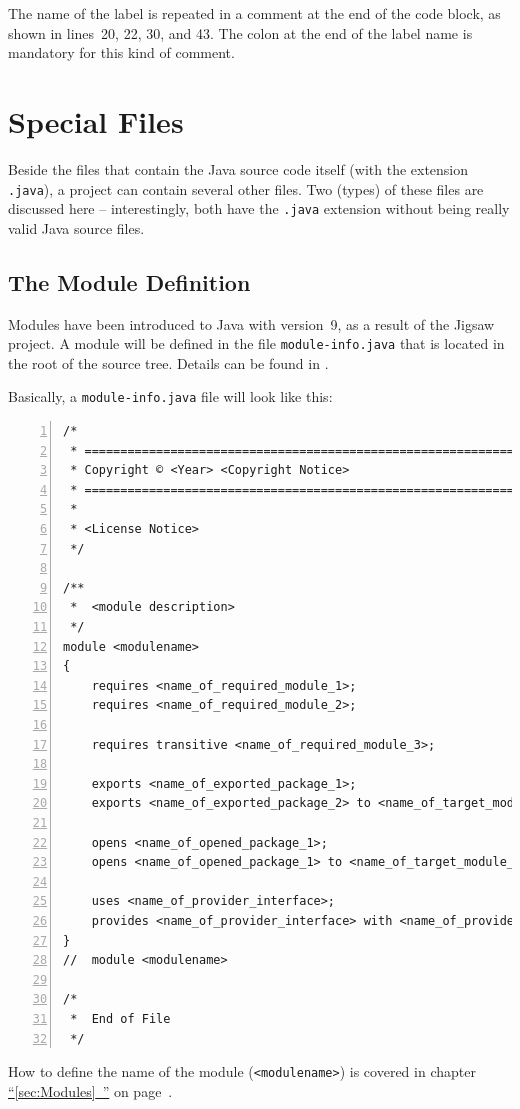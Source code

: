 \documentclass[11pt,a4paper, titlepage, parskip=half, headsepline, footsepline, cleardoublepage=current, headheight=1cm]{scrbook}
\newcommand*{\tqfullvref}[1]{\hyperref[{#1}]{“\ref*{#1}~\nameref*{#1}”} on page~\pageref{#1}}
\begin{document}
The name of the label is repeated in a comment at the end of the code block, as shown in lines~20, 22, 30, and 43. The colon at the end of the label name is mandatory for this kind of comment.


\section{Special Files}
Beside the files that contain the Java source code itself (with the extension \verb#.java#), a project can contain several other files. Two (types) of these files are discussed here – interestingly, both have the \verb#.java# extension without being really valid Java source files.

\subsection{The Module Definition}\label{sec:ModuleDefinition}
Modules have been introduced to Java with version~9, as a result of the Jigsaw project\autocite{OPENJDK:ProjectJigsaw}. A module will be defined in the file \verb#module-info.java# that is located in the root of the source tree. Details can be found in \autocite{ORACLE_DOC_LANGUAGE_SPECIFICATION:ModuleDeclarations}.

Basically, a \verb#module-info.java# file will look like this:
\begin{lstlisting}[numbers=left, caption={module-info.java},morekeywords={exports,module,opens,provides,requires,to,transitive,uses,var,with,yield}]
/*
 * ==================================================================
 * Copyright © <Year> <Copyright Notice>
 * ==================================================================
 *
 * <License Notice>
 */
 
/**
 *  <module description>
 */ 
module <modulename> 
{
    requires <name_of_required_module_1>;
    requires <name_of_required_module_2>;

    requires transitive <name_of_required_module_3>;

    exports <name_of_exported_package_1>;
    exports <name_of_exported_package_2> to <name_of_target_module_1>;

    opens <name_of_opened_package_1>;
    opens <name_of_opened_package_1> to <name_of_target_module_1>, <name_of_target_module_2>;

    uses <name_of_provider_interface>;
    provides <name_of_provider_interface> with <name_of_provider_implementation>;
}
//  module <modulename>

/*
 *  End of File
 */
\end{lstlisting}
How to define the name of the module (\lstinline|<modulename>|) is covered in chapter \tqfullvref{sec:Modules}.
\end{document}
